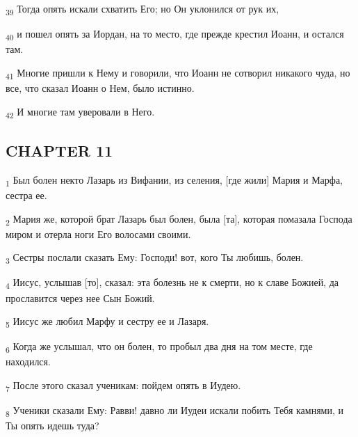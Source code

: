 \begin{tcolorbox}
\textsubscript{39} Тогда опять искали схватить Его; но Он уклонился от рук их,
\end{tcolorbox}
\begin{tcolorbox}
\textsubscript{40} и пошел опять за Иордан, на то место, где прежде крестил Иоанн, и остался там.
\end{tcolorbox}
\begin{tcolorbox}
\textsubscript{41} Многие пришли к Нему и говорили, что Иоанн не сотворил никакого чуда, но все, что сказал Иоанн о Нем, было истинно.
\end{tcolorbox}
\begin{tcolorbox}
\textsubscript{42} И многие там уверовали в Него.
\end{tcolorbox}
\subsection{CHAPTER 11}
\begin{tcolorbox}
\textsubscript{1} Был болен некто Лазарь из Вифании, из селения, [где жили] Мария и Марфа, сестра ее.
\end{tcolorbox}
\begin{tcolorbox}
\textsubscript{2} Мария же, которой брат Лазарь был болен, была [та], которая помазала Господа миром и отерла ноги Его волосами своими.
\end{tcolorbox}
\begin{tcolorbox}
\textsubscript{3} Сестры послали сказать Ему: Господи! вот, кого Ты любишь, болен.
\end{tcolorbox}
\begin{tcolorbox}
\textsubscript{4} Иисус, услышав [то], сказал: эта болезнь не к смерти, но к славе Божией, да прославится через нее Сын Божий.
\end{tcolorbox}
\begin{tcolorbox}
\textsubscript{5} Иисус же любил Марфу и сестру ее и Лазаря.
\end{tcolorbox}
\begin{tcolorbox}
\textsubscript{6} Когда же услышал, что он болен, то пробыл два дня на том месте, где находился.
\end{tcolorbox}
\begin{tcolorbox}
\textsubscript{7} После этого сказал ученикам: пойдем опять в Иудею.
\end{tcolorbox}
\begin{tcolorbox}
\textsubscript{8} Ученики сказали Ему: Равви! давно ли Иудеи искали побить Тебя камнями, и Ты опять идешь туда?
\end{tcolorbox}
